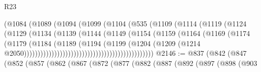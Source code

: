 \begin{lexlean}{R23}
\begin{coremodule}
{{{{{{{{{{{{{{{{{{{{{                                          (@1084
                                            (@1089
                                              (@1094
                                                (@1099
                                                  (@1104
                                                    (@535
                                                      (@1109
                                                        (@1114
                                                          (@1119
                                                            (@1124
                                                              (@1129
                                                                (@1134
                                                                  (@1139
                                                                    (@1144
                                                                      (@1149
                                                                        (@1154
                                                                          (@1159
                                                                            (@1164
                                                                              (@1169
                                                                                (@1174
                                                                                  (@1179
                                                                                    (@1184
                                                                                      (@1189
                                                                                        (@1194
                                                                                          (@1199
                                                                                            (@1204
                                                                                              (@1209
                                                                                                (@1214
                                                                                                  @2050)))))))))))))))))))))))))))))))))))))))))))))))
@2146 := @837
    (@842
      (@847
        (@852
          (@857
            (@862
              (@867
                (@872
                  (@877
                    (@882
                      (@887
                        (@892
                          (@897
                            (@898
                              (@903
}}}}}}}}}}}}}}}}}}}}}
\end{coremodule}
\end{lexlean}
